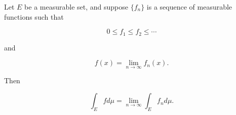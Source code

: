Let $E$ be a measurable set, and suppose $\{f_n\}$ is a sequence of measurable functions such that

$$0 \leq f_1 \leq f_2 \leq \cdots$$

and

$$f(x) = \lim_{n \to \infty} f_n(x).$$

Then

$$\int_E f d\mu = \lim_{n \to \infty} \int_E f_n d\mu.$$
